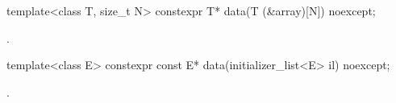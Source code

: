 %
\begin{itemdecl}
template<class T, size_t N> constexpr T* data(T (&array)[N]) noexcept;
\end{itemdecl}
\begin{itemdescr}
\pnum
\returns
{}.
\end{itemdescr}

%
\begin{itemdecl}
template<class E> constexpr const E* data(initializer_list<E> il) noexcept;
\end{itemdecl}
\begin{itemdescr}
\pnum
\returns
{}.
\end{itemdescr}
